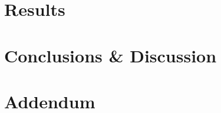 \documentclass[10pt]{article}
\begin{document}
	\section{Results}
	\label{sec::results}
	\lipsum[1-4]
	
	\section{Conclusions \& Discussion}
	\label{sec::conclusions}
	\lipsum[23-28]
	
	\section{Addendum}
	\label{sec::addendum}
	\lipsum[31-35]
	
\end{document}
